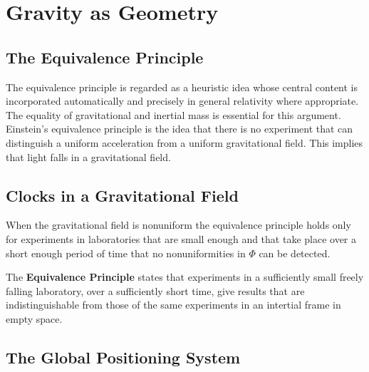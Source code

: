 %
%
%
\chapter{Gravity as Geometry}
\label{GravGeomBitch} %




\section{The Equivalence Principle}
\label{sec:equivPrinc}

The equivalence principle is regarded as a heuristic idea whose central content is incorporated automatically and precisely in general relativity where appropriate. The equality of gravitational and inertial mass is essential for this argument. Einstein's equivalence principle is the idea that there is no experiment that can distinguish a uniform acceleration from a uniform gravitational field. This implies that light falls in a gravitational field.


\section{Clocks in a Gravitational Field}
\label{sec:clockGrav}

When the gravitational field is nonuniform the equivalence principle holds only for experiments in laboratories that are small enough and that take place over a short enough period of time that no nonuniformities in $\Phi$ can be detected.

\begin{rmk}
    The \textbf{Equivalence Principle} states that experiments in a sufficiently small freely falling laboratory, over a sufficiently short time, give results that are indistinguishable from those of the same experiments in an intertial frame in empty space.
\end{rmk}


\section{The Global Positioning System}
\label{sec:GlobPos}

